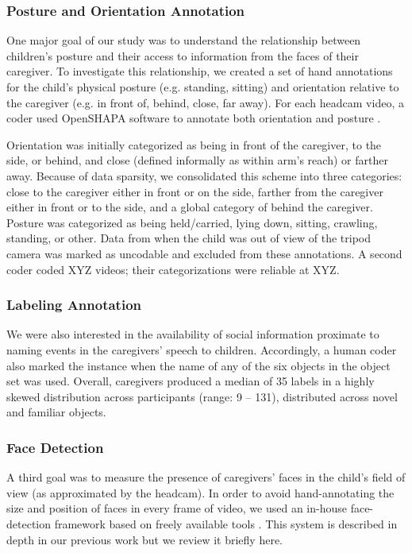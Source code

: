 \documentclass[10pt,letterpaper]{article}
\begin{document}
\subsubsection{Posture and Orientation Annotation}


One major goal of our study was to understand the relationship between children's posture and their access to information from the faces of their caregiver. To investigate this relationship, we created a set of hand annotations for the child's physical posture (e.g. standing, sitting) and orientation relative to the caregiver (e.g. in front of, behind, close, far away). For each headcam video, a coder used OpenSHAPA software to annotate both orientation and posture \cite{adolph2012}. 

Orientation was initially categorized as being in front of the caregiver, to the side, or behind, and close (defined informally as within arm's reach) or farther away. Because of data sparsity, we consolidated this scheme into three categories: close to the caregiver either in front or on the side, farther from the caregiver either in front or to the side, and a global category of behind the caregiver. Posture was categorized as being held/carried, lying down, sitting, crawling, standing, or other. Data from when the child was out of view of the tripod camera was marked as uncodable and excluded from these annotations. A second coder coded XYZ videos; their categorizations were reliable at XYZ. 

\subsubsection{Labeling Annotation}

We were also interested in the availability of social information proximate to naming events in the caregivers' speech to children. Accordingly, a human coder also marked the instance when the name of any of the six objects in the object set was used. Overall, caregivers produced a median of 35 labels in a highly skewed distribution across participants (range: 9 -- 131), distributed across novel and familiar objects.

\subsubsection{Face Detection}

A third goal was to measure the presence of caregivers' faces in the child's field of view (as approximated by the headcam). In order to avoid hand-annotating the size and position of faces in every frame of video, we used an in-house face-detection framework based on freely available tools \cite{bradski2008}. This system is described in depth in our previous work \cite{frank2012b} but we review it briefly here.
\end{document}
